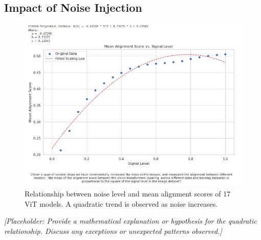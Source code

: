 \documentclass[10pt,a4paper]{article}
\begin{document}
\subsection{Impact of Noise Injection}
\begin{figure}[H]
    \centering
    \includegraphics[width=\textwidth]{alignment_vs_signal_level.png}
    \caption{Relationship between noise level and mean alignment scores of 17 ViT models. A quadratic trend is observed as noise increases.}
    \label{fig:alignment_vs_signal_level}
\end{figure}

\textit{[Placeholder: Provide a mathematical explanation or hypothesis for the quadratic relationship. Discuss any exceptions or unexpected patterns observed.]}
\end{document}
